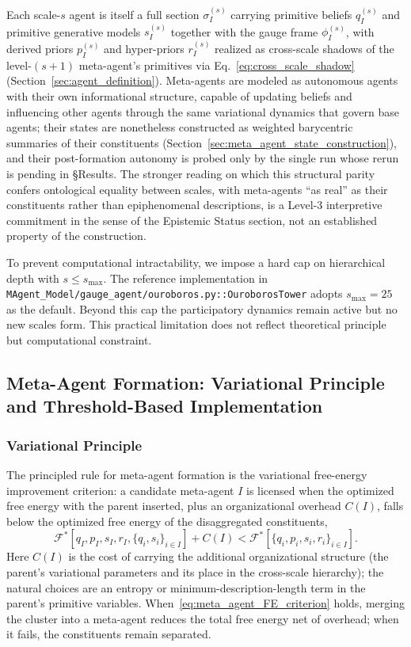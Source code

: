 \documentclass[11pt]{article}
\begin{document}
Each scale-$s$ agent is itself a full section $\sigma_I^{(s)}$ carrying primitive beliefs $q_I^{(s)}$ and primitive generative models $s_I^{(s)}$ together with the gauge frame $\phi_I^{(s)}$, with derived priors $p_I^{(s)}$ and hyper-priors $r_I^{(s)}$ realized as cross-scale shadows of the level-$(s{+}1)$ meta-agent's primitives via Eq.~\eqref{eq:cross_scale_shadow} (Section~\ref{sec:agent_definition}). Meta-agents are modeled as autonomous agents with their own informational structure, capable of updating beliefs and influencing other agents through the same variational dynamics that govern base agents; their states are nonetheless constructed as weighted barycentric summaries of their constituents (Section~\ref{sec:meta_agent_state_construction}), and their post-formation autonomy is probed only by the single run whose rerun is pending in §Results. The stronger reading on which this structural parity confers ontological equality between scales, with meta-agents ``as real'' as their constituents rather than epiphenomenal descriptions, is a Level-3 interpretive commitment in the sense of the Epistemic Status section, not an established property of the construction.

To prevent computational intractability, we impose a hard cap on hierarchical depth with $s \leq s_{\max}$. The reference implementation in \texttt{MAgent\_Model/gauge\_agent/ouroboros.py::OuroborosTower} adopts $s_{\max} = 25$ as the default. Beyond this cap the participatory dynamics remain active but no new scales form. This practical limitation does not reflect theoretical principle but computational constraint.

\subsection{Meta-Agent Formation: Variational Principle and Threshold-Based Implementation}
\label{sec:meta_agent_formation}

\subsubsection{Variational Principle}
\label{sec:meta_agent_variational}

The principled rule for meta-agent formation is the variational free-energy improvement criterion: a candidate meta-agent $I$ is licensed when the optimized free energy with the parent inserted, plus an organizational overhead $C(I)$, falls below the optimized free energy of the disaggregated constituents,
\begin{equation}
\mathcal{F}^*[q_I, p_I, s_I, r_I, \{q_i, s_i\}_{i \in I}] + C(I) < \mathcal{F}^*[\{q_i, p_i, s_i, r_i\}_{i \in I}].
\label{eq:meta_agent_FE_criterion}
\end{equation}
Here $C(I)$ is the cost of carrying the additional organizational structure (the parent's variational parameters and its place in the cross-scale hierarchy); the natural choices are an entropy or minimum-description-length term in the parent's primitive variables. When~\eqref{eq:meta_agent_FE_criterion} holds, merging the cluster into a meta-agent reduces the total free energy net of overhead; when it fails, the constituents remain separated.
\end{document}
